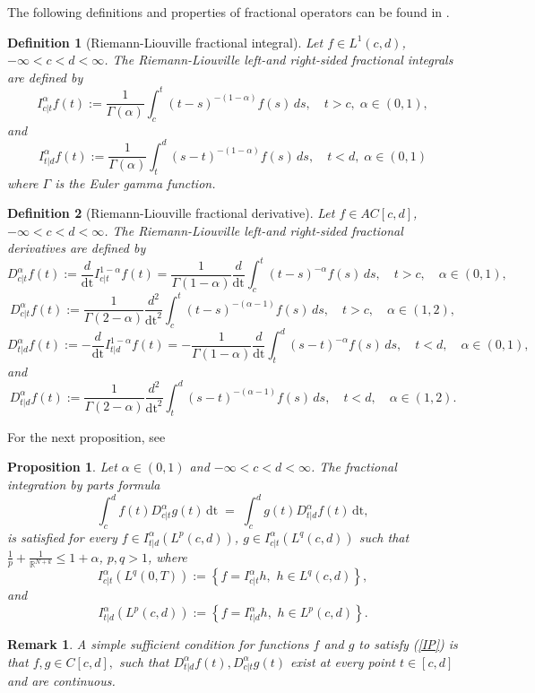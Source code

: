 \documentclass[reqno,11pt]{amsart}
\newtheorem{remark}{Remark}[section]
\newtheorem{proposition}[theorem]{Proposition}
\newtheorem{definition}{Definition}[section]
\numberwithin{equation}{section}
\def\R{{\mathbb {R}}}
\def\R{\mathbb{R}}
\begin{document}
The following definitions and properties of fractional operators can be found in \cite[Chapter~1]{Samko}.
\begin{definition}[Riemann-Liouville fractional integral]
	Let $f\in L^1(c,d)$, $-\infty<c<d<\infty$. The Riemann-Liouville left-and right-sided fractional integrals are defined by
	\begin{equation}\label{Int1}
		I^\alpha_{c|t}f(t):=\frac{1}{\Gamma(\alpha)}\int_{c}^t(t-s)^{-(1-\alpha)}f(s)\,ds, \quad t>c, \; \alpha\in(0,1),
	\end{equation}
	and
	\begin{equation}\label{Int2}
		I^\alpha_{t|d}f(t):=\frac{1}{\Gamma(\alpha)}\int_t^{d}(s-t)^{-(1-\alpha)}f(s)\,ds, \quad t<d, \; \alpha\in(0,1)
	\end{equation}
	where $\Gamma$ is the Euler gamma function.
\end{definition}

\begin{definition}[Riemann-Liouville fractional derivative]
	Let $f\in AC[c,d]$, $-\infty<c<d<\infty$. The Riemann-Liouville  left-and right-sided fractional derivatives  are defined by
	\begin{equation}\label{}
		D^\alpha_{c|t}f(t):=\frac{d}{\mathrm{dt}}I^{1-\alpha}_{c|t}f(t)=\frac{1}{\Gamma(1-\alpha)}\frac{d}{\mathrm{dt}}\int_{c}^t(t-s)^{-\alpha}f(s)\,ds, \quad t>c,\quad \alpha\in(0,1),
	\end{equation}
	$$
	D^\alpha_{c|t}f(t):=\frac{1}{\Gamma(2-\alpha)}\frac{d^2}{\mathrm{dt}^2}\int_{c}^t(t-s)^{-(\alpha-1)}f(s)\,ds, \quad t>c,\quad\alpha\in(1,2),
	$$
	\begin{equation}\label{}
		D^\alpha_{t|d}f(t):=-\frac{d}{\mathrm{dt}}I^{1-\alpha}_{t|d}f(t)=-\frac{1}{\Gamma(1-\alpha)}\frac{d}{\mathrm{dt}}\int_t^{d}(s-t)^{-\alpha}f(s)\,ds, \quad t<d,\quad \alpha\in(0,1),
	\end{equation}
	and
	$$
	D^\alpha_{t|d}f(t):=\frac{1}{\Gamma(2-\alpha)}\frac{d^2}{\mathrm{dt}^2}\int_t^{d}(s-t)^{-(\alpha-1)}f(s)\,ds, \quad t<d,\quad\alpha\in(1,2).
	$$
\end{definition}

For the next proposition, see \cite[(2.64), p. 46]{Samko}
\begin{proposition}
	Let $\alpha\in(0,1)$ and $-\infty<c<d<\infty$. The fractional integration by parts formula
	\begin{equation}\label{IP}
		\int_{c}^{d}f(t)D^\alpha_{c|t}g(t)\,\mathrm{dt} \;=\; \int_{c}^{d}
		g(t)D^\alpha_{t|d}f(t)\,\mathrm{dt},
	\end{equation}
	is satisfied for every $f\in I^\alpha_{t|d}(L^p(c,d))$, $g\in I^\alpha_{c|t}(L^q(c,d))$ such that $\frac{1}{p}+\frac{1}{\R^{N+k}}\leq 1+\alpha$, $p,q>1$, where
	\[
	I^\alpha_{c|t}(L^q(0,T)):=\left\{f= I^\alpha_{c|t}h,\,\, h\in L^q(c,d)\right\},
	\]
	and
	\[
	I^\alpha_{t|d}(L^p(c,d)):=\left\{f= I^\alpha_{t|d}h,\,\, h\in L^p(c,d)\right\}.
	\]
\end{proposition}
\begin{remark}
	A simple sufficient condition for functions $f$ and $g$ to satisfy (\ref{IP}) is that $f,g\in C[c,d],$ such that
	$D^\alpha_{t|d}f(t),D^\alpha_{c|t}g(t)$ exist at every point $t\in[c,d]$ and are continuous.
\end{remark}
\end{document}
